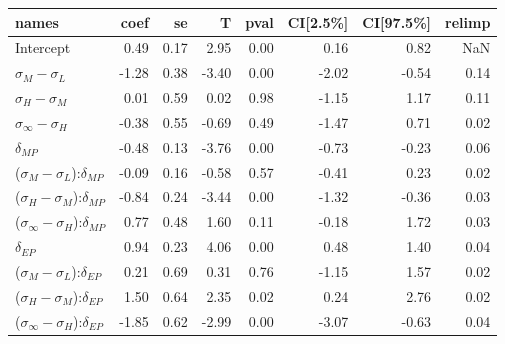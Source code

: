 \begin{tabular}{lrrrrrrr}
\toprule
                                         names &  coef &   se &     T &  pval &  CI[2.5\%] &  CI[97.5\%] &  relimp \\
\midrule
                                     Intercept &  0.49 & 0.17 &  2.95 &  0.00 &       0.16 &        0.82 &     NaN \\
                     $\sigma_{M} - \sigma_{L}$ & -1.28 & 0.38 & -3.40 &  0.00 &      -2.02 &       -0.54 &    0.14 \\
                     $\sigma_{H} - \sigma_{M}$ &  0.01 & 0.59 &  0.02 &  0.98 &      -1.15 &        1.17 &    0.11 \\
                $\sigma_{\infty} - \sigma_{H}$ & -0.38 & 0.55 & -0.69 &  0.49 &      -1.47 &        0.71 &    0.02 \\
                                 $\delta_{MP}$ & -0.48 & 0.13 & -3.76 &  0.00 &      -0.73 &       -0.23 &    0.06 \\
     ($\sigma_{M} - \sigma_{L}$):$\delta_{MP}$ & -0.09 & 0.16 & -0.58 &  0.57 &      -0.41 &        0.23 &    0.02 \\
     ($\sigma_{H} - \sigma_{M}$):$\delta_{MP}$ & -0.84 & 0.24 & -3.44 &  0.00 &      -1.32 &       -0.36 &    0.03 \\
($\sigma_{\infty} - \sigma_{H}$):$\delta_{MP}$ &  0.77 & 0.48 &  1.60 &  0.11 &      -0.18 &        1.72 &    0.03 \\
                                 $\delta_{EP}$ &  0.94 & 0.23 &  4.06 &  0.00 &       0.48 &        1.40 &    0.04 \\
     ($\sigma_{M} - \sigma_{L}$):$\delta_{EP}$ &  0.21 & 0.69 &  0.31 &  0.76 &      -1.15 &        1.57 &    0.02 \\
     ($\sigma_{H} - \sigma_{M}$):$\delta_{EP}$ &  1.50 & 0.64 &  2.35 &  0.02 &       0.24 &        2.76 &    0.02 \\
($\sigma_{\infty} - \sigma_{H}$):$\delta_{EP}$ & -1.85 & 0.62 & -2.99 &  0.00 &      -3.07 &       -0.63 &    0.04 \\
\bottomrule
\end{tabular}


